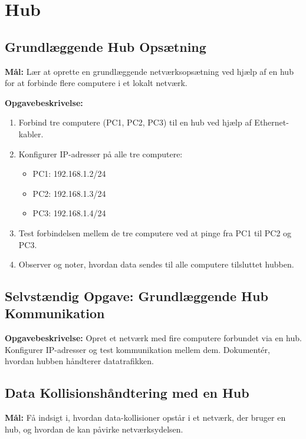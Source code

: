 \section{Hub}
\subsection*{Grundlæggende Hub Opsætning}
\textbf{Mål:} Lær at oprette en grundlæggende netværksopsætning ved hjælp af en hub for at forbinde flere computere i et lokalt netværk.

\textbf{Opgavebeskrivelse:}
\begin{enumerate}
	\item Forbind tre computere (PC1, PC2, PC3) til en hub ved hjælp af Ethernet-kabler.
	\item Konfigurer IP-adresser på alle tre computere:
	\begin{itemize}
		\item PC1: 192.168.1.2/24
		\item PC2: 192.168.1.3/24
		\item PC3: 192.168.1.4/24
	\end{itemize}
	\item Test forbindelsen mellem de tre computere ved at pinge fra PC1 til PC2 og PC3.
	\item Observer og noter, hvordan data sendes til alle computere tilsluttet hubben.
\end{enumerate}

\subsection*{Selvstændig Opgave: Grundlæggende Hub Kommunikation}
\textbf{Opgavebeskrivelse:} Opret et netværk med fire computere forbundet via en hub. Konfigurer IP-adresser og test kommunikation mellem dem. Dokumentér, hvordan hubben håndterer datatrafikken.

\subsection*{Data Kollisionshåndtering med en Hub}
\textbf{Mål:} Få indsigt i, hvordan data-kollisioner opstår i et netværk, der bruger en hub, og hvordan de kan påvirke netværksydelsen.

